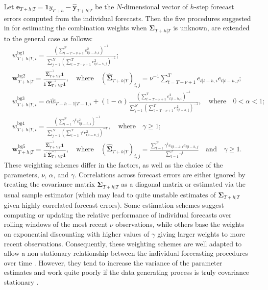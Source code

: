 \documentclass[a4paper,11pt]{article}
\begin{document}
Let $\bm{e}_{T+h|T}=\bm{1} y_{T+h}-\hat{\bm{y}}_{T+h|T}$ be the $N$-dimensional vector of $h$-step forecast errors computed from the individual forecasts. Then the five procedures suggested in \citet{Bates1969-yj} for estimating the combination weights when $\bm{\Sigma}_{T+h|T}$ is unknown, are extended to the general case as follows:
\begin{align}
  & w_{T+h|T, i}^{\text{bg1}}=\frac{\left( \sum_{t=T-\nu+1}^{T} e_{t|t-h, i}^{2} \right)^{-1}}{\sum_{j=1}^{N}\left(\sum_{t=T-\nu+1}^{T} e_{t|t-h, j}^{2}\right)^{-1}}; \label{eq:weight_bg1} \\
  & \bm{w}_{T+h|T}^{\text{bg2}}=\frac{\hat{\bm{\Sigma}}_{T+h|T}^{-1}\bm{1}}{\bm{1}^{\prime} \hat{\bm{\Sigma}}_{T+h|T}^{-1} \bm{1}}, \quad \text{where} \quad (\hat{\bm{\Sigma}}_{T+h|T})_{i, j}=\nu^{-1} \sum_{t=T-\nu+1}^{T} e_{t|t-h, i} e_{t|t-h, j};   \\
  & w_{T+h|T, i}^{\text{bg3}}=\alpha \hat{w}_{T+h-1|T-1, i} + (1-\alpha) \frac{\left( \sum_{t=T-\nu+1}^{T} e_{t|t-h, i}^{2} \right)^{-1}}{\sum_{j=1}^{N}\left(\sum_{t=T-\nu+1}^{T} e_{t|t-h, j}^{2}\right)^{-1}}, \quad \text{where} \quad 0<\alpha<1;   \\
  & w_{T+h|T, i}^{\text{bg4}}=\frac{\left( \sum_{t=1}^{T} \gamma^{t} e_{t|t-h, i}^{2} \right)^{-1}}{\sum_{j=1}^{N}\left(\sum_{t=1}^{T} \gamma^{t} e_{t|t-h, j}^{2}\right)^{-1}}, \quad \text{where} \quad \gamma \geq 1; \label{eq:weight_bg4}  \\
  & \bm{w}_{T+h|T}^{\text{bg5}}=\frac{\hat{\bm{\Sigma}}_{T+h|T}^{-1}\bm{1}}{\bm{1}^{\prime} \hat{\bm{\Sigma}}_{T+h|T}^{-1} \bm{1}}, \quad \text{where} \quad (\hat{\bm{\Sigma}}_{T+h|T})_{i, j}=\frac{\sum_{t=1}^{T} \gamma^{t} e_{t|t-h, i} e_{t|t-h, j}}{\sum_{t=1}^{T} \gamma^{t}} \quad \text{and} \quad \gamma \geq 1.
\end{align}
These weighting schemes differ in the factors, as well as the choice of the parameters, $\nu$, $\alpha$, and $\gamma$. Correlations across forecast errors are either ignored by treating the covariance matrix $\bm{\Sigma}_{T+h|T}$ as a diagonal matrix or estimated via the usual sample estimator (which may lead to quite unstable estimates of $\bm{\Sigma}_{T+h|T}$ given highly correlated forecast errors). Some estimation schemes suggest computing or updating the relative performance of individual forecasts over rolling windows of the most recent $\nu$ observations, while others base the weights on exponential discounting with higher values of $\gamma$ giving larger weights to more recent observations. Consequently, these weighting schemes are well adapted to allow a non-stationary relationship between the individual forecasting procedures over time \citep{Newbold1974-lp}. However, they tend to increase the variance of the parameter estimates and work quite poorly if the data generating process is truly covariance stationary \citep{Timmermann2006-en}.
\end{document}

